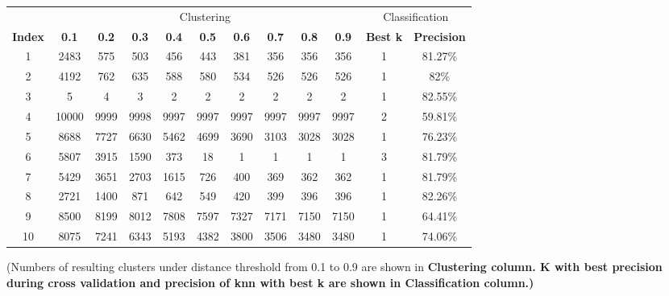 \begin{table*}
\centering
\footnotesize
{
\begin{tabular}{cccccccccccc}
 \toprule
  & \multicolumn{9}{c}{Clustering} &\multicolumn{2}{c}{Classification}\\
\cline{1-1}
\cline{2-10}
\cline{11-12}
 \bf{Index}             & {\bf 0.1}  & {\bf 0.2} & {\bf 0.3} & {\bf 0.4} & {\bf 0.5}  & {\bf 0.6} & {\bf 0.7} & {\bf 0.8} & {\bf 0.9} & {\bf Best k} & {\bf Precision} \\
              \midrule  
          1   & 2483       & 575       &  503      &   456     & 443        & 381       & 356       & 356       & 356       &     1        & 81.27\%  \\
          2   & 4192       & 762       &  635      &   588     & 580        & 534       & 526       & 526       & 526       &     1        & 82\%     \\
          3   &  5         & 4         &  3        &    2      & 2          & 2         & 2         & 2         & 2         &     1        & 82.55\%  \\
          4   & 10000      & 9999      & 9998      & 9997      & 9997       & 9997      & 9997      & 9997      & 9997      &     2        & 59.81\%  \\
          5   & 8688       & 7727      & 6630      & 5462      & 4699       & 3690      & 3103      & 3028      & 3028      &     1        & 76.23\%   \\
          6   & 5807       & 3915      & 1590      & 373       & 18         & 1         & 1         & 1         & 1         &     3        & 81.79\%   \\
          7   & 5429       & 3651      & 2703      & 1615      & 726        & 400       & 369       & 362       & 362       &     1        & 81.79\%   \\
          8   & 2721       & 1400      & 871       & 642       & 549        & 420       & 399       & 396       & 396       &     1        & 82.26\%    \\
          9   & 8500       & 8199      & 8012      & 7808      & 7597       & 7327      & 7171      & 7150      & 7150      &     1        & 64.41\%    \\
          10  & 8075       & 7241      & 6343      & 5193      & 4382       & 3800      & 3506      & 3480      & 3480      &     1        & 74.06\%    \\

\bottomrule
\end{tabular}
}
{\footnotesize{(Numbers of resulting clusters under distance threshold from 0.1 to 0.9 are shown in \bf{Clustering} column. K with best precision during cross validation and precision of knn with best k are shown in \bf{Classification} column.)}}
\end{table*}